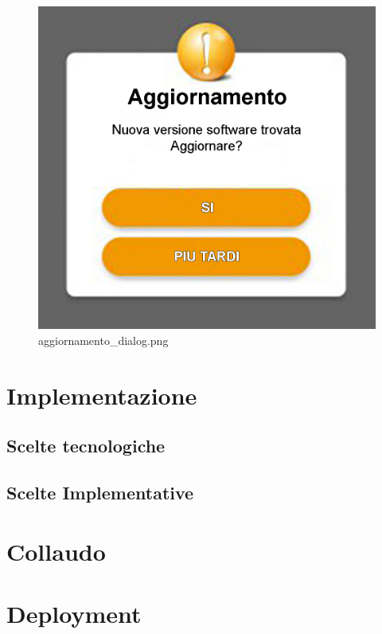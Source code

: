 \documentclass[a4paper]{article}
\begin{document}
\begin{figure}[H]
    \includegraphics[scale=0.5]{Progettazione/aggiornamento_dialog.png}
    \centering
    \caption{aggiornamento\_dialog.png}
\end{figure}


\newpage

\section{Implementazione}

\subsection{Scelte tecnologiche}

\subsection{Scelte Implementative}

\section{Collaudo}

\section{Deployment}
\end{document}
